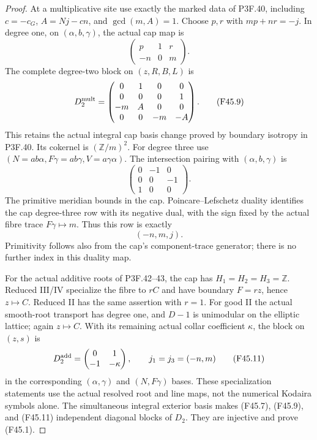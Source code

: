 \begin{proof}
At a multiplicative site use exactly the marked data of P3F.40,
including $c=-c_G$, $A=Nj-cn$, and $\gcd(m,A)=1$.
Choose $p,r$ with $mp+nr=-j$. In degree one, on
$(\alpha,b,\gamma)$, the actual cap map is
\[
       \begin{pmatrix}p&1&r\\-n&0&m\end{pmatrix}.
\]
The complete degree-two block on $(z,R,B,L)$ is
\[
 D_2^{\rm mult}=
 \begin{pmatrix}
 0&1&0&0\\0&0&0&1\\-m&A&0&0\\0&0&-m&-A
 \end{pmatrix}.                                    \tag{F45.9}
\]
This retains the actual integral cap basis change proved by
boundary isotropy in P3F.40. Its cokernel is $(\mathbb Z/m)^2$.
For degree three use $(N=ab\alpha,F\gamma=ab\gamma,
V=a\gamma\alpha)$. The intersection pairing with
$(\alpha,b,\gamma)$ is
\[
 \begin{pmatrix}0&-1&0\\0&0&-1\\1&0&0\end{pmatrix}.
\]
The primitive meridian bounds in the cap. Poincare--Lefschetz
duality identifies the cap degree-three row with its negative
dual, with the sign fixed by the actual fibre trace
$F\gamma\mapsto m$. Thus this row is exactly
\[
                             (-n,m,j).                \tag{F45.10}
\]
Primitivity follows also from the cap's component-trace
generator; there is no further index in this duality map.

For the actual additive roots of P3F.42--43, the cap has
$H_1=H_2=H_3=\mathbb Z$. Reduced III/IV specialize the fibre
to $rC$ and have boundary $F=r z$, hence $z\mapsto C$.
Reduced II has the same assertion with $r=1$.
For good II the actual smooth-root transport has degree one,
and $D-1$ is unimodular on the elliptic lattice; again
$z\mapsto C$. With its remaining actual collar coefficient
$\kappa$, the block on $(z,s)$ is
\[
 D_2^{\rm add}=\begin{pmatrix}0&1\\-1&-\kappa\end{pmatrix},
 \qquad j_1=j_3=(-n,m)                             \tag{F45.11}
\]
in the corresponding $(\alpha,\gamma)$ and $(N,F\gamma)$
bases. These specialization statements use the actual resolved
root and line maps, not the numerical Kodaira symbols alone.
The simultaneous integral exterior basis makes (F45.7),
(F45.9), and (F45.11) independent diagonal blocks of $D_2$.
They are injective and prove (F45.1).


\end{proof}
